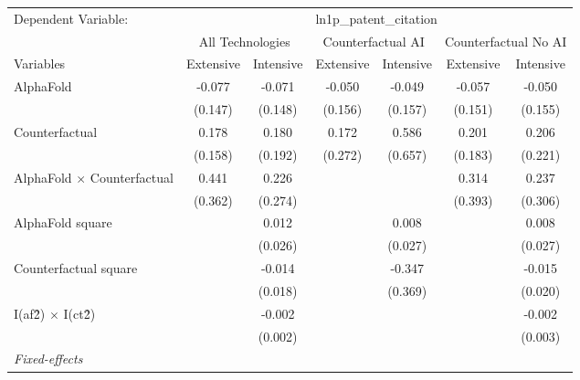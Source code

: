 \begingroup
\centering
\begin{tabular}{lcccccc}
   \tabularnewline \midrule \midrule
   Dependent Variable: & \multicolumn{6}{c}{ln1p\_patent\_citation}\\
 & \multicolumn{2}{c}{All Technologies} & \multicolumn{2}{c}{Counterfactual AI} & \multicolumn{2}{c}{Counterfactual No AI} \\
\cmidrule(lr){1-1}\cmidrule(lr){2-3} \cmidrule(lr){4-5} \cmidrule(lr){6-7}
Variables & \multicolumn{1}{c}{Extensive} & \multicolumn{1}{c}{Intensive} & \multicolumn{1}{c}{Extensive} & \multicolumn{1}{c}{Intensive} & \multicolumn{1}{c}{Extensive} & \multicolumn{1}{c}{Intensive} \\
\cmidrule(lr){1-1}\cmidrule(lr){2-2} \cmidrule(lr){3-3} \cmidrule(lr){4-4} \cmidrule(lr){5-5} \cmidrule(lr){6-6} \cmidrule(lr){7-7}
   AlphaFold                          & -0.077  & -0.071  & -0.050  & -0.049  & -0.057  & -0.050\\   
                                      & (0.147) & (0.148) & (0.156) & (0.157) & (0.151) & (0.155)\\   
   Counterfactual                     & 0.178   & 0.180   & 0.172   & 0.586   & 0.201   & 0.206\\   
                                      & (0.158) & (0.192) & (0.272) & (0.657) & (0.183) & (0.221)\\   
   AlphaFold $\times$ Counterfactual  & 0.441   & 0.226   &         &         & 0.314   & 0.237\\   
                                      & (0.362) & (0.274) &         &         & (0.393) & (0.306)\\   
   AlphaFold square                   &         & 0.012   &         & 0.008   &         & 0.008\\   
                                      &         & (0.026) &         & (0.027) &         & (0.027)\\   
   Counterfactual square              &         & -0.014  &         & -0.347  &         & -0.015\\   
                                      &         & (0.018) &         & (0.369) &         & (0.020)\\   
   I(af\^2) $\times$ I(ct\^2)         &         & -0.002  &         &         &         & -0.002\\   
                                      &         & (0.002) &         &         &         & (0.003)\\   
   \midrule
   \emph{Fixed-effects}\\

\end{tabular}
